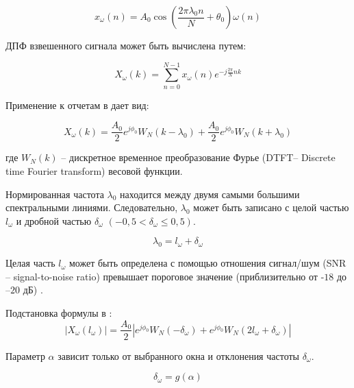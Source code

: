 \begin{equation}
	\label{eq:equation15}
	x_\omega(n)=A_0 \cos(\frac{2 \pi \lambda_0 n}{N}+\theta_0)\omega(n)
\end{equation}

ДПФ взвешенного сигнала может быть вычислена путем:

\begin{equation}
	\label{eq:equation16}
	X_\omega(k) = \sum_{n=0}^{N-1} x_\omega(n) e^{-j \frac{2 \pi}{N}nk}
\end{equation}

Применение  к отчетам в  дает вид:

\begin{equation}
	\label{eq:equation17}
	X_\omega(k) = \frac{A_0}{2} e^{j\phi_0}W_N(k-\lambda_0)+\frac{A_0}{2}e^{j\phi_0}W_N(k+\lambda_0)
\end{equation}

где $W_N (k)$ -- дискретное временное преобразование Фурье (DTFT-- Discrete time Fourier transform) весовой функции. 

Нормированная частота $\lambda_0$ находится между двумя самыми большими спектральными линиями. Следовательно, $\lambda_0$  может быть записано с целой частью $l_\omega$ и дробной частью $\delta_\omega$ $(-0,5<\delta_{\omega}\leq0,5)$.

\begin{equation}
	\label{eq:equation18}
	\lambda_0 = l_\omega + \delta_\omega
\end{equation}

Целая часть $l_\omega$ может быть определена с помощью отношения сигнал/шум (SNR -- signal-to-noise ratio) превышает пороговое значение (приблизительно от -$18$ до –$20$ дБ) \cite{rife1974single}. 

Подстановка формулы  в :
\begin{equation}
	\label{eq:equation19}
	\left|{X_\omega(l_\omega)} \right| = \frac{A_0}{2} \left| e^{j\phi_0}W_N(- \delta_\omega) +e^{j\phi_0}W_N(2l_\omega+\delta_\omega) \right| 
\end{equation}

Параметр $\alpha$ зависит только от выбранного окна и отклонения частоты $\delta_{\omega}$. 

\begin{equation}
	\label{eq:equation20}
	\delta_\omega = g(\alpha)
\end{equation}


